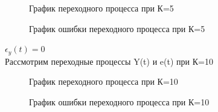 \documentclass[a4paper, 11pt]{article}
\begin{document}
\begin{figure}[h!]
    \caption{График переходного процесса при К=5}
    \label{two}
\end{figure}
\begin{figure}[h!]
    \caption{График ошибки переходного процесса при К=5}
    \label{tree}
\end{figure}

$\epsilon_y(t)=0$\\

Рассмотрим переходные процессы Y(t) и e(t) при К=10

\begin{figure}[h!]
    \caption{График переходного процесса при К=10}
    \label{two}
\end{figure}

\newpage

\begin{figure}[h!]
    \caption{График ошибки переходного процесса при К=10}
    \label{tree}
\end{figure}
\end{document}
